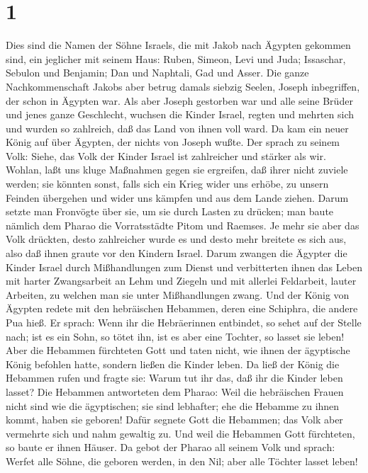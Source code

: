 \hypertarget{section}{%
\section{1}\label{section}}

 Dies sind die Namen der Söhne Israels, die mit Jakob nach
Ägypten gekommen sind, ein jeglicher mit seinem Haus: 
Ruben, Simeon, Levi und Juda;  Issaschar, Sebulon und
Benjamin;  Dan und Naphtali, Gad und Asser. 
Die ganze Nachkommenschaft Jakobs aber betrug damals siebzig Seelen,
Joseph inbegriffen, der schon in Ägypten war.  Als aber
Joseph gestorben war und alle seine Brüder und jenes ganze Geschlecht,
 wuchsen die Kinder Israel, regten und mehrten sich und
wurden so zahlreich, daß das Land von ihnen voll ward.  Da
kam ein neuer König auf über Ägypten, der nichts von Joseph wußte.
 Der sprach zu seinem Volk: Siehe, das Volk der Kinder
Israel ist zahlreicher und stärker als wir.  Wohlan, laßt
uns kluge Maßnahmen gegen sie ergreifen, daß ihrer nicht zuviele werden;
sie könnten sonst, falls sich ein Krieg wider uns erhöbe, zu unsern
Feinden übergehen und wider uns kämpfen und aus dem Lande ziehen.
 Darum setzte man Fronvögte über sie, um sie durch Lasten
zu drücken; man baute nämlich dem Pharao die Vorratsstädte Pitom und
Raemses.  Je mehr sie aber das Volk drückten, desto
zahlreicher wurde es und desto mehr breitete es sich aus, also daß ihnen
graute vor den Kindern Israel.  Darum zwangen die Ägypter
die Kinder Israel durch Mißhandlungen zum Dienst  und
verbitterten ihnen das Leben mit harter Zwangsarbeit an Lehm und Ziegeln
und mit allerlei Feldarbeit, lauter Arbeiten, zu welchen man sie unter
Mißhandlungen zwang.  Und der König von Ägypten redete
mit den hebräischen Hebammen, deren eine Schiphra, die andere Pua hieß.
 Er sprach: Wenn ihr die Hebräerinnen entbindet, so sehet
auf der Stelle nach; ist es ein Sohn, so tötet ihn, ist es aber eine
Tochter, so lasset sie leben!  Aber die Hebammen
fürchteten Gott und taten nicht, wie ihnen der ägyptische König befohlen
hatte, sondern ließen die Kinder leben.  Da ließ der
König die Hebammen rufen und fragte sie: Warum tut ihr das, daß ihr die
Kinder leben lasset?  Die Hebammen antworteten dem
Pharao: Weil die hebräischen Frauen nicht sind wie die ägyptischen; sie
sind lebhafter; ehe die Hebamme zu ihnen kommt, haben sie geboren!
 Dafür segnete Gott die Hebammen; das Volk aber vermehrte
sich und nahm gewaltig zu.  Und weil die Hebammen Gott
fürchteten, so baute er ihnen Häuser.  Da gebot der
Pharao all seinem Volk und sprach: Werfet alle Söhne, die geboren
werden, in den Nil; aber alle Töchter lasset leben!

